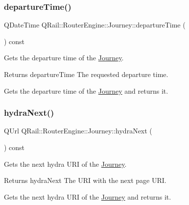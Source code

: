 \subsubsection{\texorpdfstring{departureTime()}{departureTime()}}
{\footnotesize\ttfamily Q\+Date\+Time Q\+Rail\+::\+Router\+Engine\+::\+Journey\+::departure\+Time (\begin{DoxyParamCaption}{ }\end{DoxyParamCaption}) const}



Gets the departure time of the \mbox{\hyperlink{classQRail_1_1RouterEngine_1_1Journey}{Journey}}. 

\begin{DoxyReturn}{Returns}
departure\+Time The requested departure time.
\end{DoxyReturn}
Gets the departure time of the \mbox{\hyperlink{classQRail_1_1RouterEngine_1_1Journey}{Journey}} and returns it. \mbox{\label{classQRail_1_1RouterEngine_1_1Journey_af2e3a86d876b397e5a88b89aea673145}} 
\subsubsection{\texorpdfstring{hydraNext()}{hydraNext()}}
{\footnotesize\ttfamily Q\+Url Q\+Rail\+::\+Router\+Engine\+::\+Journey\+::hydra\+Next (\begin{DoxyParamCaption}{ }\end{DoxyParamCaption}) const}



Gets the next hydra U\+RI of the \mbox{\hyperlink{classQRail_1_1RouterEngine_1_1Journey}{Journey}}. 

\begin{DoxyReturn}{Returns}
hydra\+Next The U\+RI with the next page U\+RI.
\end{DoxyReturn}
Gets the next hydra U\+RI of the \mbox{\hyperlink{classQRail_1_1RouterEngine_1_1Journey}{Journey}} and returns it. \mbox{\label{classQRail_1_1RouterEngine_1_1Journey_a670dbe08bcc3ce8e8003a0429661e18f}} 
